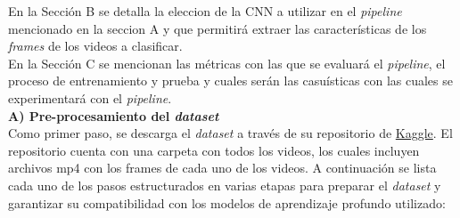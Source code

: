 En la Sección B se detalla la eleccion de la CNN a utilizar en el 
\textit{pipeline} mencionado en la seccion A y que permitirá 
extraer las características de los \textit{frames} de los videos 
a clasificar.\\

En la Sección C se mencionan las métricas con las que se evaluará el 
\textit{pipeline}, el proceso de entrenamiento y prueba y cuales 
serán las casuísticas con las cuales se experimentará con el 
\textit{pipeline}.\\

\textbf{A) Pre-procesamiento del \textit{dataset}}\label{procesamiento}\\

Como primer paso, se descarga el \textit{dataset} a 
través de su repositorio de 
\href{https://www.kaggle.com/datasets/yassershrief/hockey-fight-vidoes/data}{Kaggle}. 
El repositorio cuenta con una carpeta con todos los videos, 
los cuales incluyen archivos mp4 con los frames de cada uno 
de los videos. A continuación se lista cada uno de los pasos estructurados 
en varias etapas para preparar el \textit{dataset} y 
garantizar su compatibilidad con los modelos de aprendizaje 
profundo utilizado:

